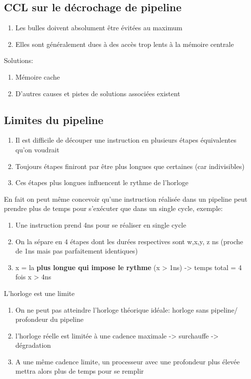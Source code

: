 \subsection{CCL sur le décrochage de pipeline}
\begin{enumerate}
\item Les bulles doivent absolument être évitées au maximum
\item Elles sont généralement dues à des accès trop lents à la mémoire centrale
\end{enumerate}

Solutions:
\begin{enumerate}
\item Mémoire cache
\item D'autres causes et pistes de solutions associées existent
\end{enumerate}

\subsection{Limites du pipeline}
\begin{enumerate}
\item Il est difficile de découper une instruction en plusieurs étapes équivalentes qu'on voudrait
\item Toujours étapes finiront par être plus longues que certaines (car indivisibles)
\item Ces étapes plus longues influencent le rythme de l'horloge
\end{enumerate}
En fait on peut même concevoir qu'une instruction réalisée dans un pipeline peut prendre plus de temps pour s'exécuter que dans un single cycle, exemple:
\begin{enumerate}
\item Une instruction prend 4ns pour se réaliser en single cycle
\item On la sépare en 4 étapes dont les durées respectives sont w,x,y, z ns (proche de 1ns mais pas parfaitement identiques)
\item x = la \textbf{plus longue qui impose le rythme} (x > 1ns) -> temps total = 4 fois x > 4ns
\end{enumerate}
L'horloge est une limite
\begin{enumerate}
\item On ne peut pas atteindre l'horloge théorique idéale: horloge sans pipeline/ profondeur du pipeline
\item l'horloge réelle est limitée à une cadence maximale -> surchauffe -> dégradation
\item A une même cadence limite, un processeur avec une profondeur plus élevée mettra alors plus de temps pour se remplir
\end{enumerate}


